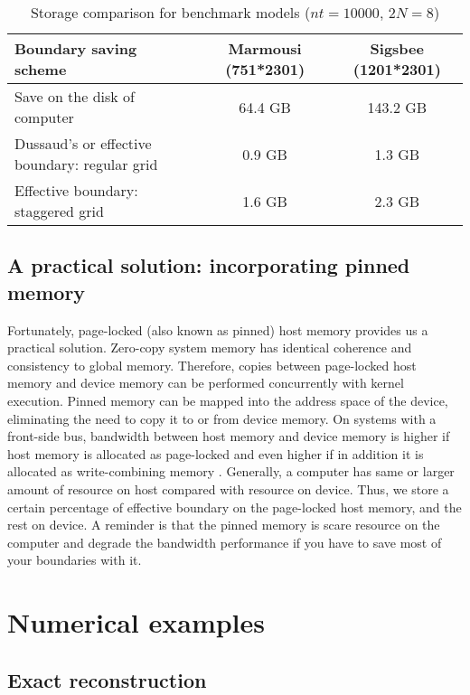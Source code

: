 \begin{table*}
  \centering
  \caption{Storage comparison for benchmark models ($nt=10000$, $2N=8$)}\label{table:4}
  \begin{tabular}{l|c|c}
     \hline
     Boundary saving scheme	  					&  Marmousi (751*2301)	& Sigsbee (1201*2301)\\
     \hline
     Save on the disk of computer					&  64.4  GB		& 143.2 GB\\
     Dussaud's or effective boundary: regular grid 			&  0.9	GB		& 1.3 GB\\
     Effective boundary: staggered grid					&  1.6	GB		& 2.3 GB\\
     \hline
   \end{tabular}
\end{table*}

\subsection{A practical solution: incorporating pinned memory}

Fortunately, page-locked (also known as pinned) host memory provides us a practical solution. Zero-copy system memory has identical coherence and consistency to global memory. Therefore,  copies between page-locked host memory and device memory can be performed concurrently with kernel execution. Pinned memory can be mapped into the address space of the device, eliminating the need to copy it to or from device memory. On systems with a front-side bus, bandwidth between host memory and device memory is higher if host memory is allocated as page-locked and even higher if in addition it is allocated as write-combining memory \citep{nvidia2011nvidia}. Generally, a computer has same or larger amount of resource on host compared with resource on device. Thus, we store a certain  percentage of effective boundary on the page-locked host memory, and the rest on device. A reminder is that the pinned memory is scare resource on the computer and degrade the bandwidth performance if you have to save most of your boundaries with it.



\section{Numerical examples}

\subsection{Exact reconstruction}

